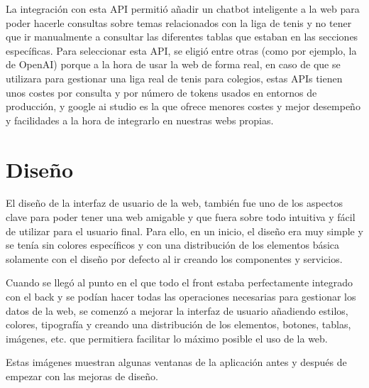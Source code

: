 La integración con esta API permitió añadir un chatbot inteligente a la web para poder hacerle consultas sobre temas relacionados con la liga de tenis y no tener que ir manualmente a consultar las diferentes tablas que estaban en las secciones específicas. Para seleccionar esta API, se eligió entre otras (como por ejemplo, la de OpenAI) porque a la hora de usar la web de forma real, en caso de que se utilizara para gestionar una liga real de tenis para colegios, estas APIs tienen unos costes por consulta y por número de tokens usados en entornos de producción, y google ai studio es la que ofrece menores costes y mejor desempeño y facilidades a la hora de integrarlo en nuestras webs propias.


\section{Diseño}\label{diseño}

El diseño de la interfaz de usuario de la web, también fue uno de los aspectos clave para poder tener una web amigable y que fuera sobre todo intuitiva y fácil de utilizar para el usuario final. Para ello, en un inicio, el diseño era muy simple y se tenía sin colores específicos y con una distribución de los elementos básica solamente con el diseño por defecto al ir creando los componentes y servicios.


Cuando se llegó al punto en el que todo el front estaba perfectamente integrado con el back y se podían hacer todas las operaciones necesarias para gestionar los datos de la web, se comenzó a mejorar la interfaz de usuario añadiendo estilos, colores, tipografía y creando una distribución de los elementos, botones, tablas, imágenes, etc. que permitiera facilitar lo máximo posible el uso de la web.

Estas imágenes muestran algunas ventanas de la aplicación antes y después de empezar con las mejoras de diseño.





